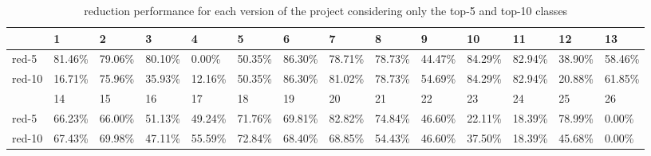 \documentclass{article}
\begin{document}
\begin{table}[h]
	\setlength{\tabcolsep}{3pt}
	\begin{tabular}{llllllllllllll}
		\toprule
		   & 1       & 2       & 3       & 4       & 5       & 6       & 7       & 8       & 9       & 10      & 11      & 12      & 13      \\\midrule
	red-5  & 81.46\% & 79.06\% & 80.10\% & 0.00\%  & 50.35\% & 86.30\% & 78.71\% & 78.73\% & 44.47\% & 84.29\% & 82.94\% & 38.90\% & 58.46\% \\
	red-10 & 16.71\% & 75.96\% & 35.93\% & 12.16\% & 50.35\% & 86.30\% & 81.02\% & 78.73\% & 54.69\% & 84.29\% & 82.94\% & 20.88\% & 61.85\% \\\midrule
		   & 14      & 15      & 16      & 17      & 18      & 19      & 20      & 21      & 22      & 23      & 24      & 25      & 26      \\\midrule
	red-5  & 66.23\% & 66.00\% & 51.13\% & 49.24\% & 71.76\% & 69.81\% & 82.82\% & 74.84\% & 46.60\% & 22.11\% & 18.39\% & 78.99\% & 0.00\%  \\
	red-10 & 67.43\% & 69.98\% & 47.11\% & 55.59\% & 72.84\% & 68.40\% & 68.85\% & 54.43\% & 46.60\% & 37.50\% & 18.39\% & 45.68\% & 0.00\%  \\
		\bottomrule
	\end{tabular}
	\caption {\ds{} reduction performance for each version of the \chart{} project considering only the top-5 and top-10 classes}
	\label{table:reduction}
\end{table}
\end{document}
